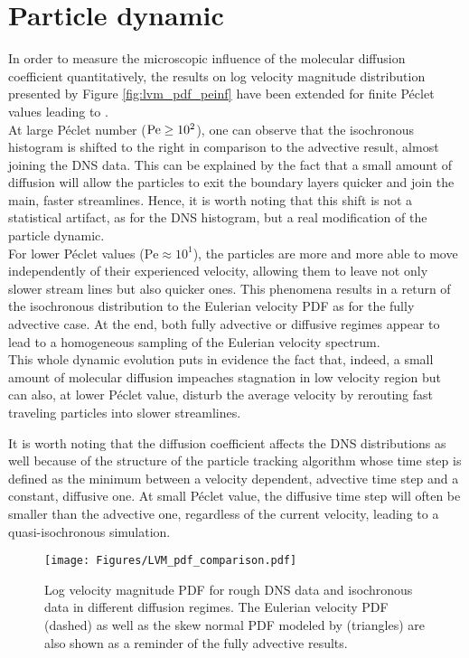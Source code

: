 \section{Particle dynamic}
In order to measure the microscopic influence of the molecular diffusion coefficient quantitatively, the results on log velocity magnitude distribution presented by Figure \ref{fig:lvm_pdf_peinf} have been extended for finite Péclet values leading to .\\
At large Péclet number ($\mathrm{Pe}\geq10^2$), one can observe that the isochronous histogram is shifted to the right in comparison to the advective result, almost joining the DNS data.
This can be explained by the fact that a small amount of diffusion will allow the particles to exit the boundary layers quicker and join the main, faster streamlines.
Hence, it is worth noting that this shift is not a statistical artifact, as for the DNS histogram, but a real modification of the particle dynamic.\\
For lower Péclet values ($\mathrm{Pe}\approx10^1$), the particles are more and more able to move independently of their experienced velocity, allowing them to leave not only slower stream lines but also quicker ones.
This phenomena results in a return of the isochronous distribution to the Eulerian velocity PDF as for the fully advective case.
At the end, both fully advective or diffusive regimes appear to lead to a homogeneous sampling of the Eulerian velocity spectrum.\\
This whole dynamic evolution puts in evidence the fact that, indeed, a small amount of molecular diffusion impeaches stagnation in low velocity region but can also, at lower Péclet value, disturb the average velocity by rerouting fast traveling particles into slower streamlines.

It is worth noting that the diffusion coefficient affects the DNS distributions as well because of the structure of the particle tracking algorithm whose time step is defined as the minimum between a velocity dependent, advective time step and a constant, diffusive one.
At small Péclet value, the diffusive time step will often be smaller than the advective one, regardless of the current velocity, leading to a quasi-isochronous simulation.\\
\begin{figure}[t]
	\centering
	\texttt{[image: Figures/LVM\_pdf\_comparison.pdf]}
	\caption{Log velocity magnitude PDF for rough DNS data and isochronous data in different diffusion regimes. The Eulerian velocity PDF (dashed) as well as the skew normal PDF modeled by \citeauthor{Meyer2016} (triangles) are also shown as a reminder of the fully advective results.}
	\label{fig:lvm_pdf_pe}
\end{figure}

